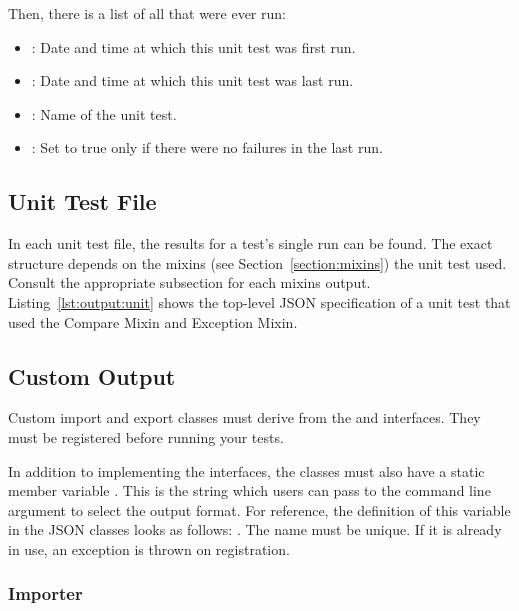 Then, there is a list of all  that were ever run:

\begin{itemize}
\item {}: Date and time at which this unit test was first run.
\item {}: Date and time at which this unit test was last run.
\item {}: Name of the unit test.
\item {}: Set to true only if there were no failures in the last run.
\end{itemize}



\subsection{Unit Test File}
\label{section:output:unit}

In each unit test file, the results for a test's single run can be found. The exact structure depends on the mixins (see Section~\ref{section:mixins}) the unit test used. Consult the appropriate subsection for each mixins output. Listing~\ref{lst:output:unit} shows the top-level JSON specification of a unit test that used the Compare Mixin and Exception Mixin.



\subsection{Custom Output}
\label{section:output:custom}

Custom import and export classes must derive from the  and interfaces. They must be registered before running your tests.

In addition to implementing the interfaces, the classes must also have a static member variable . This is the string which users can pass to the  command line argument to select the output format. For reference, the definition of this variable in the JSON classes looks as follows: . The name must be unique. If it is already in use, an exception is thrown on registration.

\subsubsection{Importer}
\label{section:output:custom:importer}

